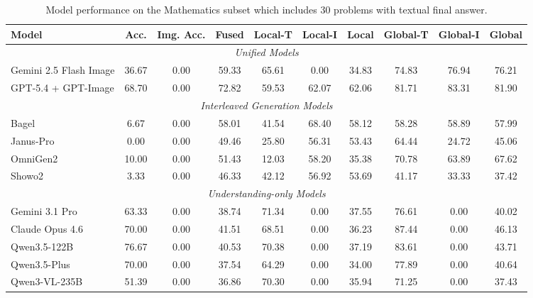 \documentclass[11pt]{article}
\begin{document}
\begin{table}[t]
  \centering
  \small
  \begin{tabular}{lccccccccc}
    \toprule
    Model & Acc. & Img. Acc. & Fused & Local-T & Local-I & Local & Global-T & Global-I & Global \\
    \midrule
    \multicolumn{10}{c}{\textit{Unified Models}} \\
    \midrule
    Gemini 2.5 Flash Image & 36.67 & 0.00 & 59.33 & 65.61 & 0.00 & 34.83 & 74.83 & 76.94 & 76.21 \\
    GPT-5.4 + GPT-Image & 68.70 & 0.00 & 72.82 & 59.53 & 62.07 & 62.06 & 81.71 & 83.31 & 81.90 \\
    \midrule
    \multicolumn{10}{c}{\textit{Interleaved Generation Models}} \\
    \midrule
    Bagel & 6.67 & 0.00 & 58.01 & 41.54 & 68.40 & 58.12 & 58.28 & 58.89 & 57.99 \\
    Janus-Pro & 0.00 & 0.00 & 49.46 & 25.80 & 56.31 & 53.43 & 64.44 & 24.72 & 45.06 \\
    OmniGen2 & 10.00 & 0.00 & 51.43 & 12.03 & 58.20 & 35.38 & 70.78 & 63.89 & 67.62 \\
    Showo2 & 3.33 & 0.00 & 46.33 & 42.12 & 56.92 & 53.69 & 41.17 & 33.33 & 37.42 \\
    \midrule
    \multicolumn{10}{c}{\textit{Understanding-only Models}} \\
    \midrule
    Gemini 3.1 Pro & 63.33 & 0.00 & 38.74 & 71.34 & 0.00 & 37.55 & 76.61 & 0.00 & 40.02 \\
    Claude Opus 4.6 & 70.00 & 0.00 & 41.51 & 68.51 & 0.00 & 36.23 & 87.44 & 0.00 & 46.13 \\
    Qwen3.5-122B & 76.67 & 0.00 & 40.53 & 70.38 & 0.00 & 37.19 & 83.61 & 0.00 & 43.71 \\
    Qwen3.5-Plus & 70.00 & 0.00 & 37.54 & 64.29 & 0.00 & 34.00 & 77.89 & 0.00 & 40.64 \\
    Qwen3-VL-235B & 51.39 & 0.00 & 36.86 & 70.30 & 0.00 & 35.94 & 71.25 & 0.00 & 37.43 \\
    \bottomrule
  \end{tabular}
  \caption{Model performance on the Mathematics subset which includes 30 problems with textual final answer.}
  \label{tab:domain_mat_metrics}
\end{table}
\end{document}
